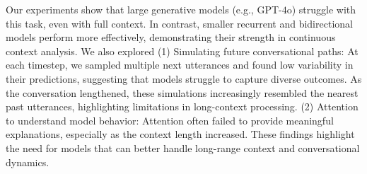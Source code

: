 Our experiments show that large generative models (e.g., GPT-$4$o) struggle with this task, even with full context.
%
In contrast, smaller recurrent and bidirectional models perform more effectively, demonstrating their strength in continuous context analysis.
%
We also explored
%
(1) Simulating future conversational paths: At each timestep, we sampled multiple next utterances and found low variability in their predictions, suggesting that models struggle to capture diverse outcomes.
%
As the conversation lengthened, these simulations increasingly resembled the nearest past utterances, highlighting limitations in long-context processing.
%
(2) Attention to understand model behavior: Attention often failed to provide meaningful explanations, especially as the context length increased.
%
These findings highlight the need for models that can better handle long-range context and conversational dynamics.
%

